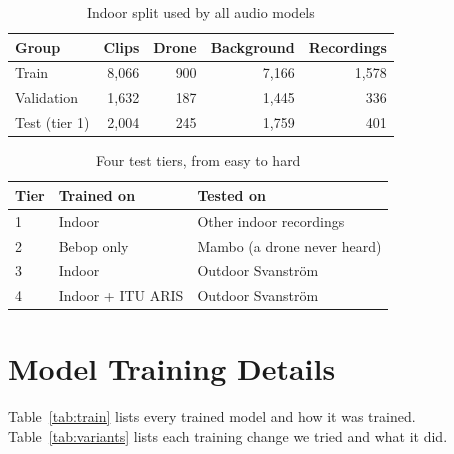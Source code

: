 \documentclass[conference,a4paper]{IEEEtran}
\begin{document}
\begin{table}[!t]
\centering\footnotesize
\caption{Indoor split used by all audio models}
\label{tab:split}
\begin{tabular}{@{}lrrrr@{}}
\toprule
Group & Clips & Drone & Background & Recordings \\
\midrule
Train & 8,066 & 900 & 7,166 & 1,578 \\
Validation & 1,632 & 187 & 1,445 & 336 \\
Test (tier 1) & 2,004 & 245 & 1,759 & 401 \\
\bottomrule
\end{tabular}
\end{table}

\begin{table}[!t]
\centering\footnotesize
\caption{Four test tiers, from easy to hard}
\label{tab:tiers}
\begin{tabularx}{\linewidth}{@{}l L{1.9cm} Y@{}}
\toprule
Tier & Trained on & Tested on \\
 & Indoor & Other indoor recordings \\
2 & Bebop only & Mambo (a drone never heard) \\
3 & Indoor & Outdoor Svanstr\"om \\
4 & Indoor + ITU ARIS & Outdoor Svanstr\"om \\
\bottomrule
\end{tabularx}
\end{table}

\section{Model Training Details}\label{sec:training}

Table~\ref{tab:train} lists every trained model and how it was trained. Table~\ref{tab:variants}
lists each training change we tried and what it did.
\end{document}
